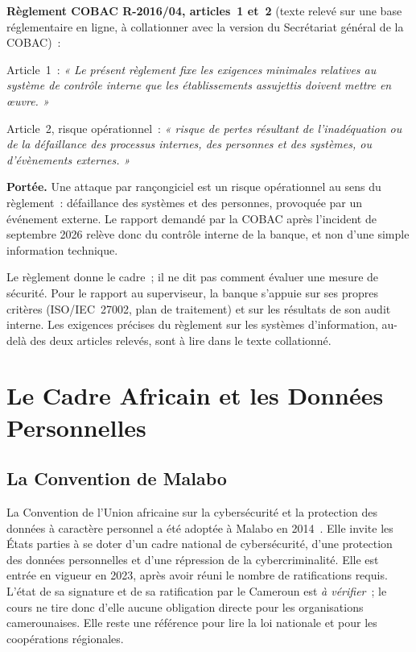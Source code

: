 \begin{boxjuris}
\textbf{Règlement COBAC R-2016/04, articles~1 et~2} (texte relevé sur une
base réglementaire en ligne, à collationner avec la version du
Secrétariat général de la COBAC)~:

\medskip
Article~1~: \textit{« Le présent règlement fixe les exigences minimales
relatives au système de contrôle interne que les établissements assujettis
doivent mettre en œuvre. »}

\medskip
Article~2, risque opérationnel~: \textit{« risque de pertes résultant de
l'inadéquation ou de la défaillance des processus internes, des personnes
et des systèmes, ou d'évènements externes. »}

\medskip
\textbf{Portée.} Une attaque par rançongiciel est un risque opérationnel
au sens du règlement~: défaillance des systèmes et des personnes,
provoquée par un événement externe. Le rapport demandé par la COBAC après
l'incident de septembre 2026 relève donc du contrôle interne de la banque,
et non d'une simple information technique.
\end{boxjuris}

Le règlement donne le cadre~; il ne dit pas comment évaluer une mesure de
sécurité. Pour le rapport au superviseur, la banque s'appuie sur ses
propres critères (ISO/IEC~27002, plan de traitement) et sur les résultats
de son audit interne. Les exigences précises du règlement sur les systèmes
d'information, au-delà des deux articles relevés, sont à lire dans le
texte collationné.

\section{Le Cadre Africain et les Données Personnelles}
\label{sec:c10-afrique}

\subsection{La Convention de Malabo}

La Convention de l'Union africaine sur la cybersécurité et la protection
des données à caractère personnel a été adoptée à Malabo en
2014~\cite{ua2014malabo}. Elle invite les États parties à se doter d'un
cadre national de cybersécurité, d'une protection des données personnelles
et d'une répression de la cybercriminalité. Elle est entrée en vigueur en
2023, après avoir réuni le nombre de ratifications requis. L'état de sa
signature et de sa ratification par le Cameroun est \emph{à vérifier}~;
le cours ne tire donc d'elle aucune obligation directe pour les
organisations camerounaises. Elle reste une référence pour lire la loi
nationale et pour les coopérations régionales.


